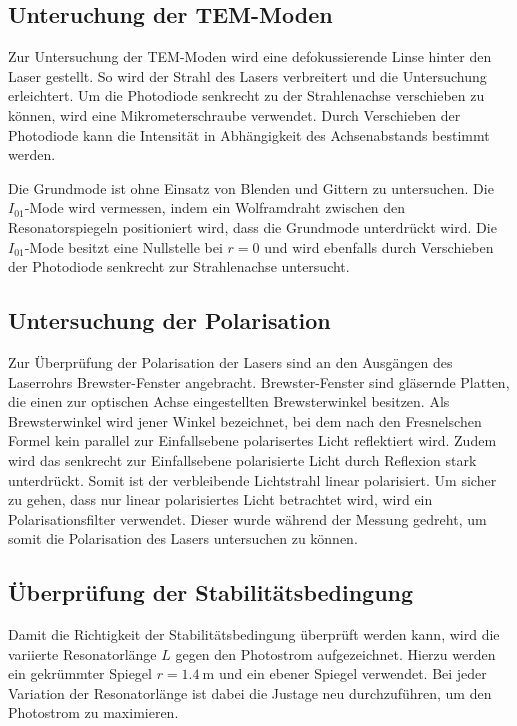 \subsection{Unteruchung der TEM-Moden}
Zur Untersuchung der TEM-Moden wird eine defokussierende Linse hinter den Laser gestellt.
So wird der Strahl des Lasers verbreitert und die Untersuchung erleichtert.
Um die Photodiode senkrecht zu der Strahlenachse verschieben zu können, wird eine
Mikrometerschraube verwendet. Durch Verschieben der Photodiode kann
die Intensität in Abhängigkeit des Achsenabstands bestimmt werden.

Die Grundmode ist ohne Einsatz von Blenden und Gittern zu untersuchen.
Die $I_{01}$-Mode wird vermessen,
indem ein Wolframdraht zwischen den Resonatorspiegeln positioniert wird,
dass die Grundmode unterdrückt wird.
Die $I_{01}$-Mode besitzt eine Nullstelle bei $r = 0$
und wird ebenfalls durch Verschieben der Photodiode senkrecht zur Strahlenachse
untersucht.

\subsection{Untersuchung der Polarisation}
Zur Überprüfung der Polarisation der Lasers sind an den Ausgängen des
Laserrohrs Brewster-Fenster angebracht. Brewster-Fenster sind gläsernde Platten, die einen
zur optischen Achse eingestellten Brewsterwinkel besitzen. Als Brewsterwinkel wird
jener Winkel bezeichnet, bei dem nach den Fresnelschen Formel kein parallel zur
Einfallsebene polarisertes Licht reflektiert wird. Zudem wird das senkrecht zur
Einfallsebene polarisierte Licht durch Reflexion stark unterdrückt. Somit ist der
verbleibende Lichtstrahl linear polarisiert. Um sicher zu gehen, dass nur linear
polarisiertes Licht betrachtet wird, wird ein Polarisationsfilter verwendet.
Dieser wurde während der Messung gedreht, um somit die Polarisation des Lasers 
untersuchen zu können.


\subsection{Überprüfung der Stabilitätsbedingung}
Damit die Richtigkeit der Stabilitätsbedingung überprüft werden kann, wird die
variierte Resonatorlänge $L$ gegen den Photostrom aufgezeichnet. Hierzu
werden ein gekrümmter Spiegel $r=\SI{1.4}{\metre}$ und ein ebener Spiegel verwendet.
Bei jeder Variation der Resonatorlänge ist dabei die Justage neu durchzuführen,
um den Photostrom zu maximieren.
